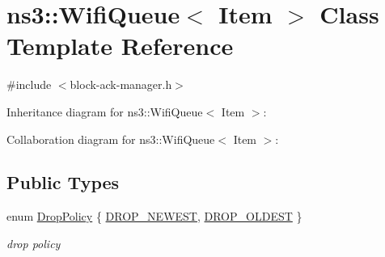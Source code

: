 \hypertarget{classns3_1_1WifiQueue}{}\section{ns3\+:\+:Wifi\+Queue$<$ Item $>$ Class Template Reference}
\label{classns3_1_1WifiQueue}


{\ttfamily \#include $<$block-\/ack-\/manager.\+h$>$}



Inheritance diagram for ns3\+:\+:Wifi\+Queue$<$ Item $>$\+:


Collaboration diagram for ns3\+:\+:Wifi\+Queue$<$ Item $>$\+:
\subsection*{Public Types}
\begin{DoxyCompactItemize}
\item 
enum \hyperlink{classns3_1_1WifiQueue_a31cd8cafb8f3f8d162183f2a1754eddc}{Drop\+Policy} \{ \hyperlink{classns3_1_1WifiQueue_a31cd8cafb8f3f8d162183f2a1754eddca3578683d483860a57f65e5e784fc19ec}{D\+R\+O\+P\+\_\+\+N\+E\+W\+E\+ST}, 
\hyperlink{classns3_1_1WifiQueue_a31cd8cafb8f3f8d162183f2a1754eddca74d01c9f08b15019a3df13c5531fcbf0}{D\+R\+O\+P\+\_\+\+O\+L\+D\+E\+ST}
 \}\begin{DoxyCompactList}\small\item\em drop policy \end{DoxyCompactList}
\end{DoxyCompactItemize}
